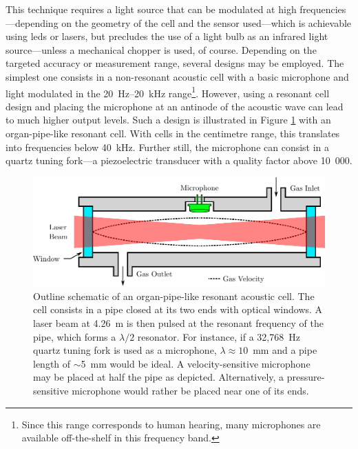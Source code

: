 This technique requires a light source that can be modulated at high frequencies---depending on the geometry of the cell and the sensor used---which is achievable using \glspl{led} or lasers, but precludes the use of a light bulb as an infrared light source---unless a mechanical chopper is used, of course. Depending on the targeted accuracy or measurement range, several designs may be employed. The simplest one consists in a non-resonant acoustic cell with a basic microphone and light modulated in the 20~Hz--20~kHz range\footnote{Since this range corresponds to human hearing, many microphones are available off-the-shelf in this frequency band.}. However, using a resonant cell design and placing the microphone at an antinode of the acoustic wave can lead to much higher output levels. Such a design is illustrated in Figure \ref{fig:choos:review:pipe_acous} with an organ-pipe-like resonant cell. With cells in the centimetre range, this translates into frequencies below 40~kHz. Further still, the microphone can consist in a quartz tuning fork---a piezoelectric transducer with a quality factor above 10~000.

\begin{figure}
	\centering
	\includegraphics[width=\linewidth]{1_main_matter/choos_figures/review/photoacous_pipe}
	\caption[Outline schematic of an organ-pipe-like resonant acoustic cell.]{Outline schematic of an organ-pipe-like resonant acoustic cell. The cell consists in a pipe closed at its two ends with optical windows. A laser beam at 4.26~\textmu{}m is then pulsed at the resonant frequency of the pipe, which forms a $\lambda/2$ resonator. For instance, if a 32,768~Hz quartz tuning fork is used as a microphone, $\lambda\approx10$~mm and a pipe length of $\sim$5~mm would be ideal. A velocity-sensitive microphone may be placed at half the pipe as depicted. Alternatively, a pressure-sensitive microphone would rather be placed near one of its ends.}
	\label{fig:choos:review:pipe_acous}
\end{figure}

